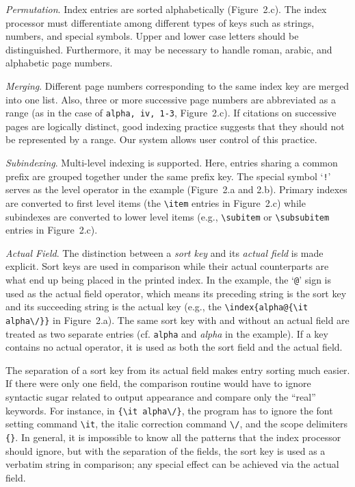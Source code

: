 {\it Permutation\/}.  Index entries are sorted alphabetically (Figure~2.c).
The index processor must differentiate among different types of keys
such as strings, numbers, and special symbols.
Upper and lower case letters should be distinguished.
Furthermore, it may be necessary to handle roman, arabic, and
alphabetic page numbers.

{\it Merging\/}.  Different page numbers corresponding to the same
index key are merged into one list.  Also, three or more
successive page numbers are abbreviated as a range (as in the
case of \verb|alpha, iv, 1-3|, Figure~2.c).  If citations on successive
pages are logically distinct, good indexing practice suggests that they
should not be represented by a range.  Our system allows user control
of this practice.

{\it Subindexing\/}.  Multi-level indexing is supported.
Here, entries sharing a common prefix are grouped together
under the same prefix key.
The special symbol `\verb|!|' serves as the level operator
in the example (Figure~2.a and 2.b).  Primary indexes are 
converted to first level items (the \verb|\item| entries in Figure~2.c)
while subindexes are converted to lower level items
(e.g., \verb|\subitem| or \verb|\subsubitem| entries in Figure~2.c).

{\it Actual Field\/}.  The distinction between a {\it sort key\/} 
and its	{\it actual field\/} is made explicit.
Sort keys are used in comparison while their actual counterparts are 
what end up being placed in the printed index.
In the example, the `\verb|@|'
sign is used as the actual field operator, which means its
preceding string is the sort key and its succeeding string
is the actual key (e.g., the \verb|\index{alpha@{\it alpha\/}}|
in Figure~2.a).
The same sort key with and without an actual field
are treated as two separate entries (cf. \verb|alpha| and {\it alpha\/}
in the example).  If a key contains no actual operator,
it is used as both the sort field and the actual field.

The separation of a sort key from its actual field makes entry sorting
much easier.  If there were only one field,
the comparison routine would have to ignore syntactic sugar related to
output appearance and compare only the ``real'' keywords.
For instance, in \verb|{\it alpha\/}|, the program has to ignore the font
setting command \verb|\it|, the italic correction command \verb|\/|,
and the scope delimiters \verb|{}|.
In general, it is impossible to know
all the patterns that the index processor should ignore,
but with the separation of the fields, the sort key is used as a verbatim string
in comparison; any special effect can be achieved via the actual field.

